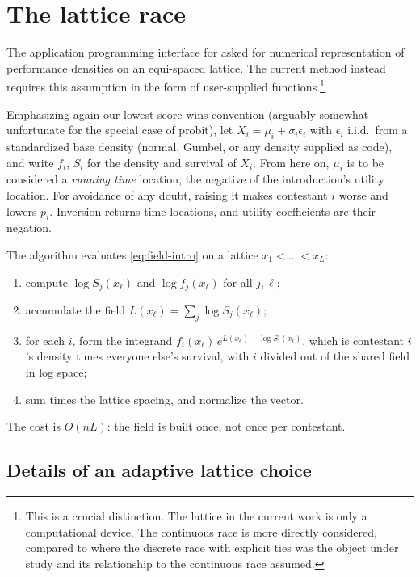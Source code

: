 \documentclass[11pt]{article}
\begin{document}
\section{The lattice race}\label{sec:lattice}

The application programming interface for \citet{cotton2021} asked for numerical representation of performance densities on an equi-spaced lattice. The current method instead requires this assumption in the form of user-supplied functions.\footnote{This is a crucial distinction. The lattice in the current work is only a computational device. The continuous race is more directly considered, compared to \citet{cotton2021} where the discrete race with explicit ties was the object under study and its relationship to the continuous race assumed.}

Emphasizing again our lowest-score-wins convention (arguably somewhat unfortunate for the special case of probit), let $X_i=\mu_i+\sigma_i
\epsilon_i$ with $\epsilon_i$ i.i.d.\ from a standardized base density (normal,
Gumbel, or any density supplied as code), and write $f_i$, $S_i$ for the density
and survival of $X_i$. From here on, $\mu_i$ is to be considered a \emph{running time}
location, the negative of the introduction's utility location. For avoidance of any doubt, raising
it makes contestant $i$ worse and lowers $p_i$. Inversion returns time
locations, and utility coefficients are their negation.

The algorithm evaluates \eqref{eq:field-intro} on a lattice $x_1<\dots<x_L$:
\begin{enumerate}\itemsep2pt
\item compute $\log S_j(x_\ell)$ and $\log f_j(x_\ell)$ for all $j,\ell$;
\item accumulate the field $L(x_\ell)=\sum_j \log S_j(x_\ell)$;
\item for each $i$, form the integrand
      $f_i(x_\ell)\,e^{L(x_\ell)-\log S_i(x_\ell)}$, which is contestant $i$'s
      density times everyone else's survival, with $i$ divided out of the shared
      field in log space;
\item sum times the lattice spacing, and normalize the vector.
\end{enumerate}
The cost is $O(nL)$: the field is built once, not once per contestant.

\subsection{Details of an adaptive lattice choice}
\end{document}
